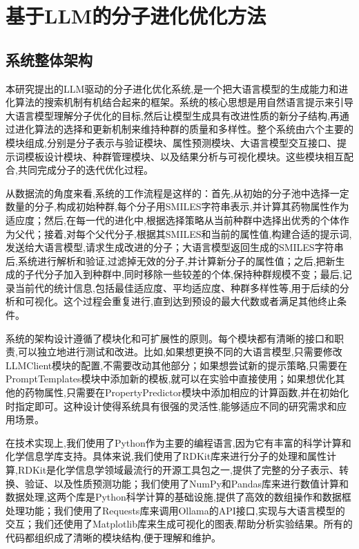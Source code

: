 \chapter{基于LLM的分子进化优化方法}

\section{系统整体架构}

本研究提出的LLM驱动的分子进化优化系统,是一个把大语言模型的生成能力和进化算法的搜索机制有机结合起来的框架。系统的核心思想是用自然语言提示来引导大语言模型理解分子优化的目标,然后让模型生成具有改进性质的新分子结构,再通过进化算法的选择和更新机制来维持种群的质量和多样性。整个系统由六个主要的模块组成,分别是分子表示与验证模块、属性预测模块、大语言模型交互接口、提示词模板设计模块、种群管理模块、以及结果分析与可视化模块。这些模块相互配合,共同完成分子的迭代优化过程。

从数据流的角度来看,系统的工作流程是这样的：首先,从初始的分子池中选择一定数量的分子,构成初始种群,每个分子用SMILES字符串表示,并计算其药物属性作为适应度；然后,在每一代的进化中,根据选择策略从当前种群中选择出优秀的个体作为父代；接着,对每个父代分子,根据其SMILES和当前的属性值,构建合适的提示词,发送给大语言模型,请求生成改进的分子；大语言模型返回生成的SMILES字符串后,系统进行解析和验证,过滤掉无效的分子,并计算新分子的属性值；之后,把新生成的子代分子加入到种群中,同时移除一些较差的个体,保持种群规模不变；最后,记录当前代的统计信息,包括最佳适应度、平均适应度、种群多样性等,用于后续的分析和可视化。这个过程会重复进行,直到达到预设的最大代数或者满足其他终止条件。

系统的架构设计遵循了模块化和可扩展性的原则。每个模块都有清晰的接口和职责,可以独立地进行测试和改进。比如,如果想更换不同的大语言模型,只需要修改LLMClient模块的配置,不需要改动其他部分；如果想尝试新的提示策略,只需要在PromptTemplates模块中添加新的模板,就可以在实验中直接使用；如果想优化其他的药物属性,只需要在PropertyPredictor模块中添加相应的计算函数,并在初始化时指定即可。这种设计使得系统具有很强的灵活性,能够适应不同的研究需求和应用场景。

在技术实现上,我们使用了Python作为主要的编程语言,因为它有丰富的科学计算和化学信息学库支持。具体来说,我们使用了RDKit库来进行分子的处理和属性计算,RDKit是化学信息学领域最流行的开源工具包之一,提供了完整的分子表示、转换、验证、以及性质预测功能；我们使用了NumPy和Pandas库来进行数值计算和数据处理,这两个库是Python科学计算的基础设施,提供了高效的数组操作和数据框处理功能；我们使用了Requests库来调用Ollama的API接口,实现与大语言模型的交互；我们还使用了Matplotlib库来生成可视化的图表,帮助分析实验结果。所有的代码都组织成了清晰的模块结构,便于理解和维护。

